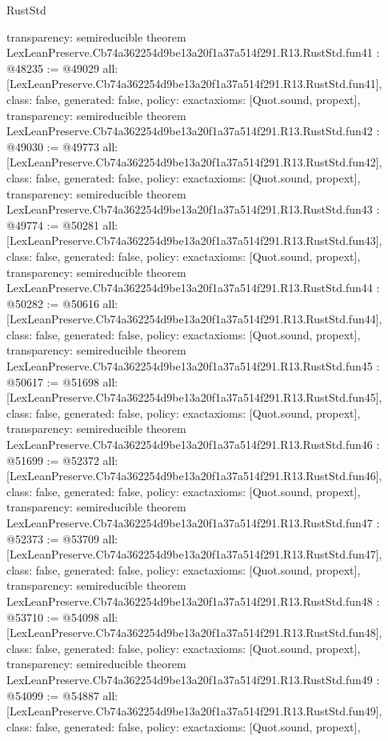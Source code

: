 \begin{lexlean}{RustStd}
\begin{coremodule}
{  transparency: semireducible
}
theorem LexLeanPreserve.Cb74a362254d9be13a20f1a37a514f291.R13.RustStd.fun41 : @48235 := @49029 {
  all: [LexLeanPreserve.Cb74a362254d9be13a20f1a37a514f291.R13.RustStd.fun41],
  class: false,
  generated: false,
  policy: exact{axioms: [Quot.sound, propext]},
  transparency: semireducible
}
theorem LexLeanPreserve.Cb74a362254d9be13a20f1a37a514f291.R13.RustStd.fun42 : @49030 := @49773 {
  all: [LexLeanPreserve.Cb74a362254d9be13a20f1a37a514f291.R13.RustStd.fun42],
  class: false,
  generated: false,
  policy: exact{axioms: [Quot.sound, propext]},
  transparency: semireducible
}
theorem LexLeanPreserve.Cb74a362254d9be13a20f1a37a514f291.R13.RustStd.fun43 : @49774 := @50281 {
  all: [LexLeanPreserve.Cb74a362254d9be13a20f1a37a514f291.R13.RustStd.fun43],
  class: false,
  generated: false,
  policy: exact{axioms: [Quot.sound, propext]},
  transparency: semireducible
}
theorem LexLeanPreserve.Cb74a362254d9be13a20f1a37a514f291.R13.RustStd.fun44 : @50282 := @50616 {
  all: [LexLeanPreserve.Cb74a362254d9be13a20f1a37a514f291.R13.RustStd.fun44],
  class: false,
  generated: false,
  policy: exact{axioms: [Quot.sound, propext]},
  transparency: semireducible
}
theorem LexLeanPreserve.Cb74a362254d9be13a20f1a37a514f291.R13.RustStd.fun45 : @50617 := @51698 {
  all: [LexLeanPreserve.Cb74a362254d9be13a20f1a37a514f291.R13.RustStd.fun45],
  class: false,
  generated: false,
  policy: exact{axioms: [Quot.sound, propext]},
  transparency: semireducible
}
theorem LexLeanPreserve.Cb74a362254d9be13a20f1a37a514f291.R13.RustStd.fun46 : @51699 := @52372 {
  all: [LexLeanPreserve.Cb74a362254d9be13a20f1a37a514f291.R13.RustStd.fun46],
  class: false,
  generated: false,
  policy: exact{axioms: [Quot.sound, propext]},
  transparency: semireducible
}
theorem LexLeanPreserve.Cb74a362254d9be13a20f1a37a514f291.R13.RustStd.fun47 : @52373 := @53709 {
  all: [LexLeanPreserve.Cb74a362254d9be13a20f1a37a514f291.R13.RustStd.fun47],
  class: false,
  generated: false,
  policy: exact{axioms: [Quot.sound, propext]},
  transparency: semireducible
}
theorem LexLeanPreserve.Cb74a362254d9be13a20f1a37a514f291.R13.RustStd.fun48 : @53710 := @54098 {
  all: [LexLeanPreserve.Cb74a362254d9be13a20f1a37a514f291.R13.RustStd.fun48],
  class: false,
  generated: false,
  policy: exact{axioms: [Quot.sound, propext]},
  transparency: semireducible
}
theorem LexLeanPreserve.Cb74a362254d9be13a20f1a37a514f291.R13.RustStd.fun49 : @54099 := @54887 {
  all: [LexLeanPreserve.Cb74a362254d9be13a20f1a37a514f291.R13.RustStd.fun49],
  class: false,
  generated: false,
  policy: exact{axioms: [Quot.sound, propext]},
}
\end{coremodule}
\end{lexlean}
